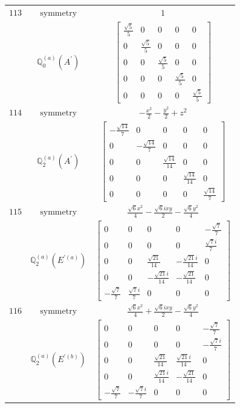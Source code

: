 \documentclass[fleqn,8pt,landscape]{jsarticle}
\begin{document}
\begin{longtable}{ccc}
$ 113 $ & $ \text{symmetry} $ & $ 1 $ \\
$  $ & $ \mathbb{Q}_{0}^{(a)}(A^{\prime}) $ & $ \begin{bmatrix} \frac{\sqrt{5}}{5} & 0 & 0 & 0 & 0 \\ 0 & \frac{\sqrt{5}}{5} & 0 & 0 & 0 \\ 0 & 0 & \frac{\sqrt{5}}{5} & 0 & 0 \\ 0 & 0 & 0 & \frac{\sqrt{5}}{5} & 0 \\ 0 & 0 & 0 & 0 & \frac{\sqrt{5}}{5} \end{bmatrix} $ \\ \hline
$ 114 $ & $ \text{symmetry} $ & $ - \frac{x^{2}}{2} - \frac{y^{2}}{2} + z^{2} $ \\
$  $ & $ \mathbb{Q}_{2}^{(a)}(A^{\prime}) $ & $ \begin{bmatrix} - \frac{\sqrt{14}}{7} & 0 & 0 & 0 & 0 \\ 0 & - \frac{\sqrt{14}}{7} & 0 & 0 & 0 \\ 0 & 0 & \frac{\sqrt{14}}{14} & 0 & 0 \\ 0 & 0 & 0 & \frac{\sqrt{14}}{14} & 0 \\ 0 & 0 & 0 & 0 & \frac{\sqrt{14}}{7} \end{bmatrix} $ \\ \hline
$ 115 $ & $ \text{symmetry} $ & $ \frac{\sqrt{6} x^{2}}{4} - \frac{\sqrt{6} i x y}{2} - \frac{\sqrt{6} y^{2}}{4} $ \\
$  $ & $ \mathbb{Q}_{2}^{(a)}(E^{\prime(a)}) $ & $ \begin{bmatrix} 0 & 0 & 0 & 0 & - \frac{\sqrt{7}}{7} \\ 0 & 0 & 0 & 0 & \frac{\sqrt{7} i}{7} \\ 0 & 0 & \frac{\sqrt{21}}{14} & - \frac{\sqrt{21} i}{14} & 0 \\ 0 & 0 & - \frac{\sqrt{21} i}{14} & - \frac{\sqrt{21}}{14} & 0 \\ - \frac{\sqrt{7}}{7} & \frac{\sqrt{7} i}{7} & 0 & 0 & 0 \end{bmatrix} $ \\ \hline
$ 116 $ & $ \text{symmetry} $ & $ \frac{\sqrt{6} x^{2}}{4} + \frac{\sqrt{6} i x y}{2} - \frac{\sqrt{6} y^{2}}{4} $ \\
$  $ & $ \mathbb{Q}_{2}^{(a)}(E^{\prime(b)}) $ & $ \begin{bmatrix} 0 & 0 & 0 & 0 & - \frac{\sqrt{7}}{7} \\ 0 & 0 & 0 & 0 & - \frac{\sqrt{7} i}{7} \\ 0 & 0 & \frac{\sqrt{21}}{14} & \frac{\sqrt{21} i}{14} & 0 \\ 0 & 0 & \frac{\sqrt{21} i}{14} & - \frac{\sqrt{21}}{14} & 0 \\ - \frac{\sqrt{7}}{7} & - \frac{\sqrt{7} i}{7} & 0 & 0 & 0 \end{bmatrix} $ \\ \hline

\end{longtable}
\end{document}
